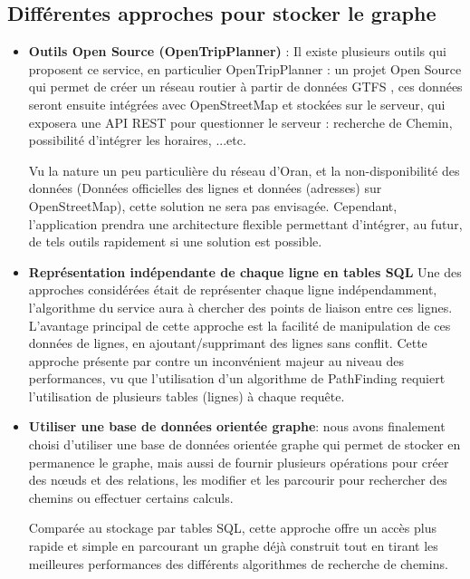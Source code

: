 \subsection{Différentes approches pour stocker le graphe}
\begin{itemize}
	\item \textbf{Outils Open Source (OpenTripPlanner)} : 
	      Il existe plusieurs outils qui proposent ce service, en particulier OpenTripPlanner\cite{OpenTripPlanner} : un projet Open Source qui permet de créer un réseau routier à partir de données GTFS , ces données seront ensuite intégrées avec OpenStreetMap et stockées sur le serveur, qui exposera une API REST pour questionner le serveur : recherche de Chemin, possibilité d'intégrer les horaires, ...etc.
	      		
	      Vu la nature un peu particulière du réseau d'Oran, et la non-disponibilité des données (Données officielles des lignes et données (adresses) sur OpenStreetMap), cette solution ne sera pas envisagée. 
	      Cependant, l'application prendra une architecture flexible permettant d'intégrer, au futur, de tels outils rapidement si une solution est possible.
	\item \textbf{Représentation indépendante de chaque ligne en tables SQL}
	      Une des approches considérées était de représenter chaque ligne indépendamment, l'algorithme du service aura à chercher des points de liaison entre ces lignes.
	      L'avantage principal de cette approche est la facilité de manipulation de ces données de lignes, en ajoutant/supprimant des lignes sans conflit.
	      Cette approche présente par contre un inconvénient majeur au niveau des performances, vu que l'utilisation d'un algorithme de PathFinding requiert l'utilisation de plusieurs tables (lignes) à chaque requête.
	      
	\item \textbf{Utiliser une base de données orientée graphe}: nous avons finalement choisi d'utiliser une base de données orientée graphe qui permet de stocker en permanence le graphe, mais aussi de fournir plusieurs opérations pour créer des nœuds et des relations, les modifier et les parcourir pour rechercher des chemins ou effectuer certains calculs.
	
Comparée au stockage par tables SQL, cette approche offre un accès plus rapide et simple en parcourant un graphe déjà construit tout en tirant les meilleures performances des différents algorithmes de recherche de chemins.


\end{itemize}
